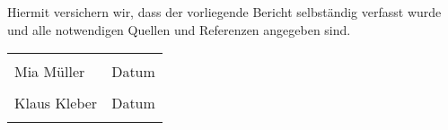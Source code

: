 %
Hiermit versichern wir, dass der vorliegende Bericht selbständig verfasst wurde und alle notwendigen Quellen und Referenzen angegeben sind.

\begin{tabular}{@{}p{2.5in}p{2.5in}@{}}
 \\[5\bigskipamount]
  \dotfill & \dotfill \\
  Mia Müller & Datum \\[5\bigskipamount]
  \dotfill & \dotfill \\
 Klaus Kleber  & Datum \\
  \centering
  
\end{tabular}
%